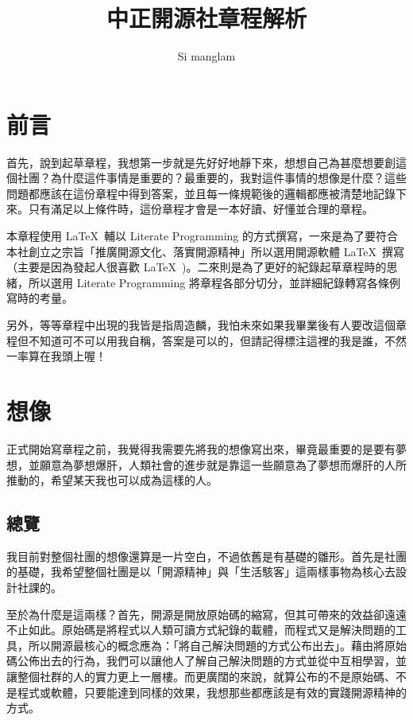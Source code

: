\documentclass[12pt, a4paper]{NGPLB}
\title{中正開源社章程解析}
\author{Si manglam}
\begin{document}
\maketitle
\chapter{前言}

首先，說到起草章程，我想第一步就是先好好地靜下來，想想自己為甚麼想要創這個社團？為什麼這件事情是重要的？最重要的，我對這件事情的想像是什麼？這些問題都應該在這份章程中得到答案，並且每一條規範後的邏輯都應被清楚地記錄下來。只有滿足以上條件時，這份章程才會是一本好讀、好懂並合理的章程。

本章程使用 \LaTeX\ 輔以 Literate Programming 的方式撰寫，一來是為了要符合本社創立之宗旨「推廣開源文化、落實開源精神」所以選用開源軟體 \LaTeX\ 撰寫（主要是因為發起人很喜歡 \LaTeX\ )。二來則是為了更好的紀錄起草章程時的思緒，所以選用 Literate Programming 將章程各部分切分，並詳細紀錄轉寫各條例寫時的考量。

另外，等等章程中出現的我皆是指周造麟，我怕未來如果我畢業後有人要改這個章程但不知道可不可以用我自稱，答案是可以的，但請記得標注這裡的我是誰，不然一率算在我頭上喔！

\chapter{想像}

正式開始寫章程之前，我覺得我需要先將我的想像寫出來，畢竟最重要的是要有夢想，並願意為夢想爆肝，人類社會的進步就是靠這一些願意為了夢想而爆肝的人所推動的，希望某天我也可以成為這樣的人。

\section{總覽}

我目前對整個社團的想像還算是一片空白，不過依舊是有基礎的雛形。首先是社團的基礎，我希望整個社團是以「開源精神」與「生活駭客」這兩樣事物為核心去設計社課的。

\begin{figure}
\begin{center}
\end{center}
\end{figure}

至於為什麼是這兩樣？首先，開源是開放原始碼的縮寫，但其可帶來的效益卻遠遠不止如此。原始碼是將程式以人類可讀方式紀錄的載體，而程式又是解決問題的工具，所以開源最核心的概念應為：「將自己解決問題的方式公布出去」。藉由將原始碼公佈出去的行為，我們可以讓他人了解自己解決問題的方式並從中互相學習，並讓整個社群的人的實力更上一層樓。而更廣闊的來說，就算公布的不是原始碼、不是程式或軟體，只要能達到同樣的效果，我想那些都應該是有效的實踐開源精神的方式。
\end{document}
